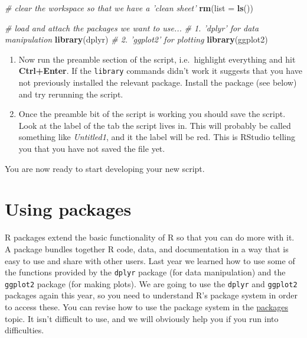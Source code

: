 \documentclass[]{book}
\newenvironment{Shaded}{\begin{snugshade}}{\end{snugshade}}
\newcommand{\KeywordTok}[1]{\textcolor[rgb]{0.13,0.29,0.53}{\textbf{{#1}}}}
\newcommand{\DataTypeTok}[1]{\textcolor[rgb]{0.13,0.29,0.53}{{#1}}}
\newcommand{\CommentTok}[1]{\textcolor[rgb]{0.56,0.35,0.01}{\textit{{#1}}}}
\newcommand{\NormalTok}[1]{{#1}}
\begin{document}
\begin{Shaded}
\begin{Highlighting}[]
\CommentTok{# clear the workspace so that we have a 'clean sheet'}
\KeywordTok{rm}\NormalTok{(}\DataTypeTok{list =} \KeywordTok{ls}\NormalTok{())}

\CommentTok{# load and attach the packages we want to use...}
\CommentTok{# 1. 'dplyr' for data manipulation}
\KeywordTok{library}\NormalTok{(dplyr)}
\CommentTok{# 2. 'ggplot2' for plotting}
\KeywordTok{library}\NormalTok{(ggplot2)}
\end{Highlighting}
\end{Shaded}

\begin{enumerate}
\def\labelenumi{\arabic{enumi}.}
\setcounter{enumi}{3}
\item
  Now run the preamble section of the script, i.e.~highlight everything
  and hit \textbf{Ctrl+Enter}. If the \texttt{library} commands didn't
  work it suggests that you have not previously installed the relevant
  package. Install the package (see below) and try rerunning the script.
\item
  Once the preamble bit of the script is working you should save the
  script. Look at the label of the tab the script lives in. This will
  probably be called something like \emph{Untitled1}, and it the label
  will be red. This is RStudio telling you that you have not saved the
  file yet.
\end{enumerate}

You are now ready to start developing your new script.

\section{Using packages}\label{using-packages}

R packages extend the basic functionality of R so that you can do more
with it. A package bundles together R code, data, and documentation in a
way that is easy to use and share with other users. Last year we learned
how to use some of the functions provided by the \texttt{dplyr} package
(for data manipulation) and the \texttt{ggplot2} package (for making
plots). We are going to use the \texttt{dplyr} and \texttt{ggplot2}
packages again this year, so you need to understand R's package system
in order to access these. You can revise how to use the package system
in the
\href{http://dzchilds.github.io/aps-data-analysis-L1/help-packages.html}{packages}
topic. It isn't difficult to use, and we will obviously help you if you
run into difficulties.
\end{document}
